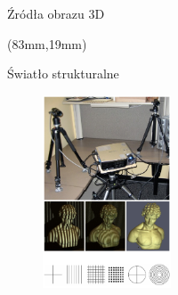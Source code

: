 \documentclass[xcolor=x11names,compress]{beamer}
\renewcommand{\(}{\begin{columns}}
\renewcommand{\)}{\end{columns}}
\newcommand{\<}[1]{\begin{column}{#1}}
\renewcommand{\>}{\end{column}}
\begin{document}
\begin{frame}{Źródła obrazu 3D}
\begin{textblock*}{40mm}
\begin{minipage}[l]{40mm}
    \end{minipage}
\end{textblock*}

\begin{textblock*}{40mm}(83mm,19mm)%
    \begin{minipage}[l]{40mm}%
    \centering
	\alert{Światło strukturalne}
	\begin{figure}[h!]
    \centering
    \includegraphics[width=3.8cm]{../Common/img/struct_vert}
    \end{figure}

    \end{minipage}
\end{textblock*}


\end{frame}










\end{document}

